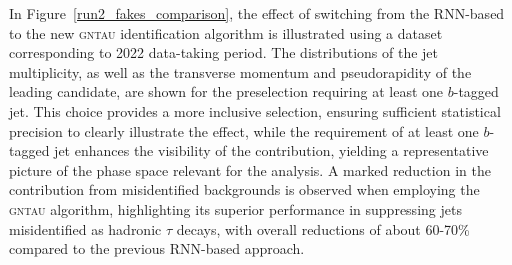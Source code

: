   In Figure~\ref{run2_fakes_comparison}, the effect of switching from the RNN-based to the new \textsc{gntau} identification algorithm is illustrated using a dataset corresponding to 2022 data-taking period.  
  The distributions of the jet multiplicity, as well as the transverse momentum and pseudorapidity of the leading \tauhad candidate, are shown for the preselection requiring at least one $b$-tagged jet.  
  This choice provides a more inclusive selection, ensuring sufficient statistical precision to clearly illustrate the effect, while the requirement of at least one $b$-tagged jet enhances the visibility of the \ttbar contribution, yielding a representative picture of the phase space relevant for the analysis.  
  A marked reduction in the contribution from misidentified \tauhad backgrounds is observed when employing the \textsc{gntau} algorithm, highlighting its superior performance in suppressing jets misidentified as hadronic $\tau$ decays, with overall reductions of about 60-70\% compared to the previous RNN-based approach.
  
